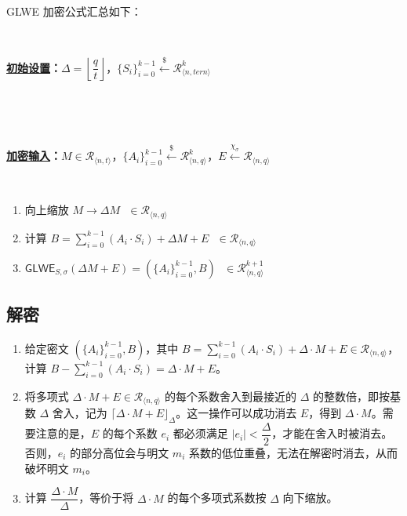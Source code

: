 $ $

GLWE 加密公式汇总如下：

$ $

\begin{tcolorbox}[title={\textbf{\tboxlabel{\ref*{subsec:glwe-enc}} GLWE 加密}}]

\textbf{\underline{初始设置}：}$\Delta = \left\lfloor\dfrac{q}{t}\right\rfloor$，$\{S_i\}_{i=0}^{k-1} \xleftarrow{\$} \mathcal{R}_{\langle n, \textit{tern} \rangle}^k$

$ $

$ $

\textbf{\underline{加密输入}：}$M \in \mathcal{R}_{\langle n, t \rangle}$，$\{A_i\}_{i=0}^{k-1} \xleftarrow{\$} \mathcal{R}_{\langle n,q \rangle}^{k}$，$E \xleftarrow{\chi_\sigma} \mathcal{R}_{\langle n,q \rangle}$

$ $

\begin{enumerate}

\item 向上缩放 $M \longrightarrow \Delta M \text { } \in \mathcal{R}_{\langle n, q\rangle}$

\item 计算 $B = \sum\limits_{i=0}^{k-1}{(A_i \cdot S_i)} + \Delta  M + E \text{ } \in \mathcal{R}_{\langle n,q \rangle}$

\item $\textsf{GLWE}_{S,\sigma}(\Delta M + E) = (\{A_i\}_{i=0}^{k-1}, B) \text{ } \in \mathcal{R}_{\langle n,q \rangle}^{k + 1}$ 



\end{enumerate}

\end{tcolorbox}

\subsection{解密}
\label{subsec:glwe-dec}

\begin{enumerate}
\item 给定密文 $(\{A_i\}_{i=0}^{k-1}, B)$，其中 $B = \sum\limits_{i=0}^{k-1}{(A_i \cdot S_i)} + \Delta \cdot M + E \in \mathcal{R}_{\langle n,q \rangle}$，计算 $B - \sum\limits_{i=0}^{k-1}{(A_i \cdot S_i)} = \Delta \cdot M + E$。
\item 将多项式 $\Delta \cdot M + E \in \mathcal{R}_{\langle n,q \rangle}$ 的每个系数舍入到最接近的 $\Delta$ 的整数倍，即按基数 $\Delta$ 舍入，记为 $\lceil \Delta \cdot M + E \rfloor_{\Delta}$。这一操作可以成功消去 $E$，得到 $\Delta \cdot M$。需要注意的是，$E$ 的每个系数 $e_i$ 都必须满足 $|e_i| < \dfrac{\Delta}{2}$，才能在舍入时被消去。否则，$e_i$ 的部分高位会与明文 $m_i$ 系数的低位重叠，无法在解密时消去，从而破坏明文 $m_i$。
\item 计算 $\dfrac{\Delta \cdot M} {\Delta}$，等价于将 $\Delta \cdot M$ 的每个多项式系数按 $\Delta$ 向下缩放。
\end{enumerate}

